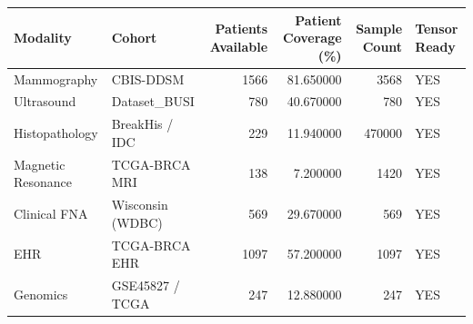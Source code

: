 \begin{tabular}{llrrrl}
\toprule
Modality & Cohort & Patients Available & Patient Coverage (\%) & Sample Count & Tensor Ready \\
\midrule
Mammography & CBIS-DDSM & 1566 & 81.650000 & 3568 & YES \\
Ultrasound & Dataset\_BUSI & 780 & 40.670000 & 780 & YES \\
Histopathology & BreakHis / IDC & 229 & 11.940000 & 470000 & YES \\
Magnetic Resonance & TCGA-BRCA MRI & 138 & 7.200000 & 1420 & YES \\
Clinical FNA & Wisconsin (WDBC) & 569 & 29.670000 & 569 & YES \\
EHR & TCGA-BRCA EHR & 1097 & 57.200000 & 1097 & YES \\
Genomics & GSE45827 / TCGA & 247 & 12.880000 & 247 & YES \\
\bottomrule
\end{tabular}
